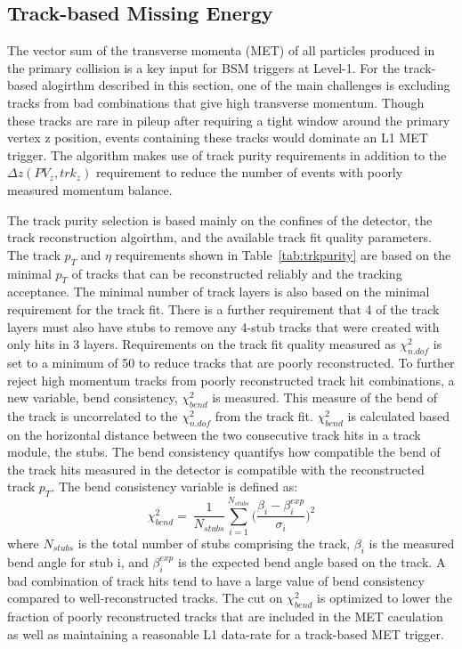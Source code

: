 \subsection{Track-based Missing Energy}
\label{sec:TkMET}

The vector sum of the transverse momenta (MET) of all particles produced in the primary collision is a key input for BSM triggers at Level-1. For the track-based alogirthm described in this section, one of the main challenges is excluding tracks from bad combinations that give high transverse momentum. Though these tracks are rare in pileup after requiring a tight window around the primary vertex z position, events containing these tracks would dominate an L1 MET trigger. The algorithm makes use of track purity requirements in addition to the $\Delta z\left(PV_{z}, trk_{z}\right)$ requirement to reduce the number of events with poorly measured momentum balance. 

The track purity selection is based mainly on the confines of the detector, the track reconstruction algoirthm, and the available track fit quality parameters. The track $p_{T}$ and $\eta$ requirements shown in Table~\ref{tab:trkpurity} are based on the minimal $p_{T}$ of tracks that can be reconstructed reliably and the tracking acceptance. The minimal number of track layers is also based on the minimal requirement for the track fit. There is a further requirement that 4 of the track layers must also have stubs to remove any 4-stub tracks that were created with only hits in 3 layers. Requirements on the track fit quality measured as $\chi^{2}_{n.dof}$ is set to a minimum of 50 to reduce tracks that are poorly reconstructed. To further reject high momentum tracks from poorly reconstructed track hit combinations, a new variable, bend consistency, $\chi^{2}_{bend}$ is measured. This measure of the bend of the track is uncorrelated to the $\chi^{2}_{n.dof}$ from the track fit. $\chi^{2}_{bend}$ is calculated based on the horizontal distance between the two consecutive track hits in a track module, the stubs. The bend consistency quantifys how compatible the bend of the track hits measured in the detector is compatible with the reconstructed track $p_{T}$. The bend consistency variable is defined as:
\begin{equation}
\chi^{2}_{bend} =~ \frac{1}{N_{stubs}} \sum_{i=1}^{N_{stubs}}\Big(\frac{\beta_i - \beta_i^{exp}}{\sigma_{i}}\Big)^2
\end{equation}
where $N_{stubs}$ is the total number of stubs comprising the track, $\beta_{i}$ is the measured bend angle for stub i, and $\beta_i^{exp}$ is the expected bend angle based on the track. A bad combination of track hits tend to have a large value of bend consistency compared to well-reconstructed tracks. The cut on $\chi^{2}_{bend}$ is optimized to lower the fraction of poorly reconstructed tracks that are included in the MET caculation as well as maintaining a reasonable L1 data-rate for a track-based MET trigger. 



